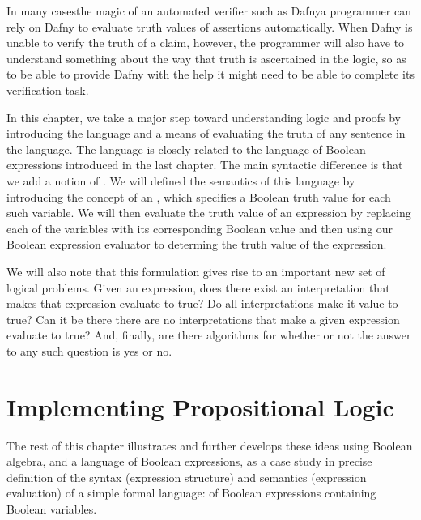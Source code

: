 \documentclass[letterpaper,10pt,english]{sphinxmanual}
\begin{document}
In many cases\textendash{}the magic of an automated verifier such as Dafny\textendash{}a
programmer can rely on Dafny to evaluate truth values of assertions
automatically. When Dafny is unable to verify the truth of a claim,
however, the programmer will also have to understand something about
the way that truth is ascertained in the logic, so as to be able to
provide Dafny with the help it might need to be able to complete its
verification task.

In this chapter, we take a major step toward understanding logic and
proofs by introducing the language  and a means
of evaluating the truth of any sentence in the language. The language
is closely related to the language of Boolean expressions introduced
in the last chapter. The main syntactic difference is that we add a
notion of . We will defined the semantics of
this language by introducing the concept of an , which
specifies a Boolean truth value for each such variable. We will then
evaluate the truth value of an expression  by replacing each of the
variables with its corresponding Boolean value and then using our
Boolean expression evaluator to determing the truth value of the
expression.

We will also note that this formulation gives rise to an important new
set of logical problems. Given an expression, does there exist an
interpretation that makes that expression evaluate to true? Do all
interpretations make it value to true? Can it be there there are no
interpretations that make a given expression evaluate to true?  And,
finally, are there  algorithms for  whether or
not the answer to any such question is yes or no.


\section{Implementing Propositional Logic}
\label{\detokenize{11-propositional-logic:implementing-propositional-logic}}
The rest of this chapter illustrates and further develops these ideas
using Boolean algebra, and a language of Boolean expressions, as a
case study in precise definition of the syntax (expression structure)
and semantics (expression evaluation) of a simple formal language: of
Boolean expressions containing Boolean variables.
\end{document}
